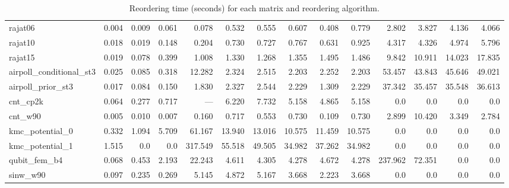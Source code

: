 \begin{sidewaystable}
{\begin{tabular}{ l r r r r r r r r r r r r r }
      rajat06 & 0.004 & 0.009 & 0.061 & 0.078 & 0.532 & 0.555 & 0.607 & 0.408 & 0.779 & 2.802 & 3.827 & 4.136 & 4.066 \\
      rajat10 & 0.018 & 0.019 & 0.148 & 0.204 & 0.730 & 0.727 & 0.767 & 0.631 & 0.925 & 4.317 & 4.326 & 4.974 & 5.796 \\
      rajat15 & 0.019 & 0.078 & 0.399 & 1.008 & 1.330 & 1.268 & 1.355 & 1.495 & 1.486 & 9.842 & 10.911 & 14.023 & 17.835 \\
      airpoll\_conditional\_st3 & 0.025 & 0.085 & 0.318 & 12.282 & 2.324 & 2.515 & 2.203 & 2.252 & 2.203 & 53.457 & 43.843 & 45.646 & 49.021 \\
      airpoll\_prior\_st3 & 0.017 & 0.084 & 0.150 & 1.830 & 2.327 & 2.544 & 2.229 & 1.309 & 2.229 & 37.342 & 35.457 & 35.548 & 36.613 \\
      cnt\_cp2k & 0.064 & 0.277 & 0.717 & --- & 6.220 & 7.732 & 5.158 & 4.865 & 5.158 & 0.0 & 0.0 & 0.0 & 0.0 \\
      cnt\_w90 & 0.005 & 0.010 & 0.007 & 0.160 & 0.717 & 0.553 & 0.730 & 0.109 & 0.730 & 2.899 & 10.420 & 3.349 & 2.784 \\
      kmc\_potential\_0 & 0.332 & 1.094 & 5.709 & 61.167 & 13.940 & 13.016 & 10.575 & 11.459 & 10.575 & 0.0 & 0.0 & 0.0 & 0.0 \\
      kmc\_potential\_1 & 1.515 & 0.0 & 0.0 & 317.549 & 55.518 & 49.505 & 34.982 & 37.262 & 34.982 & 0.0 & 0.0 & 0.0 & 0.0 \\
      qubit\_fem\_b4 & 0.068 & 0.453 & 2.193 & 22.243 & 4.611 & 4.305 & 4.278 & 4.672 & 4.278 & 237.962 & 72.351 & 0.0 & 0.0 \\
      sinw\_w90 & 0.097 & 0.235 & 0.269 & 5.145 & 4.872 & 5.167 & 3.668 & 2.223 & 3.668 & 0.0 & 0.0 & 0.0 & 0.0 \\
      \bottomrule
    \end{tabular}
    }%
    \caption{Reordering time (seconds) for each matrix and reordering algorithm.}%
    \label{tbl:reorder_time_results}
\end{sidewaystable}

\clearpage



